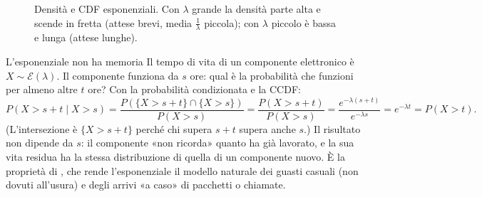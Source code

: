 \begin{figure}[H]
\centering
{}
\caption{Densità e CDF esponenziali. Con $\lambda$ grande la densità parte alta e scende in fretta (attese brevi,
media $\frac1\lambda$ piccola); con $\lambda$ piccolo è bassa e lunga (attese lunghe).}
\end{figure}

\begin{esempio}{L'esponenziale non ha memoria}
Il tempo di vita di un componente elettronico è $X \sim \mathcal{E}(\lambda)$. Il componente funziona da $s$ ore:
qual è la probabilità che funzioni per almeno altre $t$ ore? Con la probabilità condizionata e la CCDF:
\[
  P(X > s + t \mid X > s) = \frac{P(\{X > s + t\} \cap \{X > s\})}{P(X > s)} = \frac{P(X > s + t)}{P(X > s)} =
  \frac{e^{-\lambda(s + t)}}{e^{-\lambda s}} = e^{-\lambda t} = P(X > t) .
\]
(L'intersezione è $\{X > s + t\}$ perché chi supera $s + t$ supera anche $s$.) Il risultato non dipende da $s$: il
componente «non ricorda» quanto ha già lavorato, e la sua vita residua ha la stessa distribuzione di quella di un
componente nuovo. È la proprietà di , che rende l'esponenziale il modello naturale dei
guasti casuali (non dovuti all'usura) e degli arrivi «a caso» di pacchetti o chiamate.
\end{esempio}

